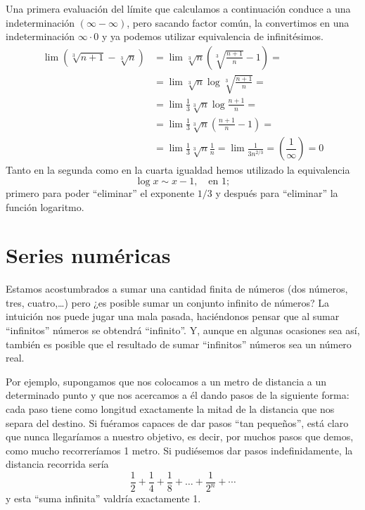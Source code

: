 \begin{ejemplo}
Una primera evaluación del límite que calculamos a continuación conduce a una indeterminación $(\infty-\infty)$, pero sacando factor común, la convertimos en una indeterminación $\infty\cdot 0$ y ya podemos utilizar equivalencia de infinitésimos.
\begin{align*}
\lim(\sqrt[3]{n+1}-\sqrt[3]n)
&= \lim \sqrt[3]n\left(\sqrt[3]{\frac{n+1}{n}}-1\right) =\\
&= \lim \sqrt[3]n\log\sqrt[3]{\frac{n+1}{n}}= \\
&= \lim \frac13\sqrt[3]n\log\frac{n+1}{n} =\\
&= \lim \frac13\sqrt[3]n\left(\frac{n+1}{n}-1\right) =\\
&= \lim \frac13\sqrt[3]n \frac1{n} = \lim \frac1{3n^{2/3}} = \left(\dfrac1\infty\right)=0
\end{align*}
Tanto en la segunda como en la cuarta igualdad hemos utilizado la equivalencia 
\[
\log x\sim x-1,\quad\text{en }1;
\]
primero para poder ``eliminar'' el exponente $1/3$ y después para ``eliminar'' la función logaritmo.\fej
\end{ejemplo}

\newpage
\section{Series numéricas}


Estamos acostumbrados a sumar una cantidad finita de números (dos números, tres, cuatro,\dots) pero ¿es posible sumar un conjunto infinito de números? La intuición nos puede jugar una mala pasada, haciéndonos pensar que al sumar ``infinitos'' números se obtendrá ``infinito''. Y, aunque en algunas ocasiones sea así, también es posible que el resultado de sumar ``infinitos'' números sea un número real.

Por ejemplo, supongamos que nos colocamos a un metro de distancia a un determinado punto y que nos acercamos a él dando pasos de la siguiente forma: cada paso tiene como longitud exactamente la mitad de la distancia que nos separa del destino. Si fuéramos capaces de dar pasos ``tan pequeños'', está claro que nunca llegaríamos a nuestro objetivo, es decir, por muchos pasos que demos, como mucho recorreríamos 1 metro. Si pudiésemos dar pasos indefinidamente, la distancia recorrida sería
\[
\dfrac12+\dfrac14+\dfrac18+\dots+\dfrac1{2^n}+\cdots
\]
y esta ``suma infinita'' valdría exactamente 1.

